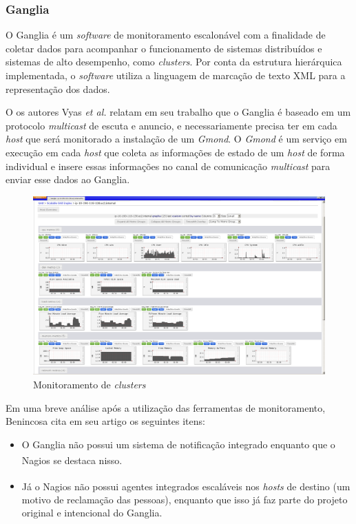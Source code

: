 
\subsubsection{Ganglia}

 O Ganglia é um \textit{software} de monitoramento escalonável com a finalidade de coletar dados para acompanhar o funcionamento de sistemas distribuídos e sistemas de alto desempenho, como \textit{clusters}. Por conta da estrutura hierárquica implementada, o \textit{software} utiliza a linguagem de marcação de texto XML para a representação dos dados. 
 
 O os autores Vyas \textit{et al.} \cite{vyas2014embedding} relatam em seu trabalho que o Ganglia é baseado em um protocolo \textit{multicast} de escuta e anuncio, e necessariamente precisa ter em cada \textit{host} que será monitorado a instalação de um \textit{Gmond}. O \textit{Gmond} é um serviço em execução em cada \textit{host} que coleta as informações de estado de um \textit{host} de forma individual e insere essas informações no canal de comunicação \textit{multicast} para enviar esse dados ao Ganglia.
 
 \begin{figure}[H]
	\begin{center}
	\includegraphics[scale = 0.50]{img/1024px-ScalableGridEngineGanglia2.png}
		\caption{Monitoramento de \textit{clusters} \cite{Ganglia}}
		\label{fun:fig:ganglia}
	\end{center}
\end{figure}
 
 
 Em uma breve análise após a utilização das ferramentas de monitoramento, Benincosa \cite{benincosa2ganglia} cita em seu artigo os seguintes itens:
\begin{itemize}

\item O Ganglia não possui um sistema de notificação integrado enquanto que o Nagios\textsuperscript{\textregistered} se destaca nisso.
\item Já o Nagios\textsuperscript{\textregistered} não possui agentes integrados escaláveis nos \textit{hosts} de destino (um motivo de reclamação das pessoas), enquanto que isso já faz parte do projeto original e intencional do Ganglia.

\end{itemize}

